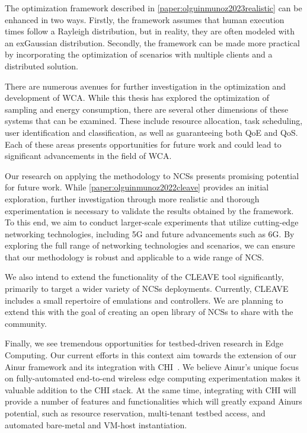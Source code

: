 The optimization framework described in \cref{paper:olguinmunoz2023realistic} can be enhanced in two ways.
Firstly, the framework assumes that human execution times follow a Rayleigh distribution, but in reality, they are often modeled with an \gls{exGaussian} distribution.
Secondly, the framework can be made more practical by incorporating the optimization of scenarios with multiple clients and a distributed solution.

There are numerous avenues for further investigation in the optimization and development of \gls{WCA}.
While this thesis has explored the optimization of sampling and energy consumption, there are several other dimensions of these systems that can be examined.
These include resource allocation, task scheduling, user identification and classification, as well as guaranteeing both \gls{QoE} and \gls{QoS}.
Each of these areas presents opportunities for future work and could lead to significant advancements in the field of \gls{WCA}.

\medskip
Our research on applying the methodology to \glspl{NCS} presents promising potential for future work.
While \cref{paper:olguinmunoz2022cleave} provides an initial exploration, further investigation through more realistic and thorough experimentation is necessary to validate the results obtained by the framework.
To this end, we aim to conduct larger-scale experiments that utilize cutting-edge networking technologies, including 5G and future advancements such as 6G.
By exploring the full range of networking technologies and scenarios, we can ensure that our methodology is robust and applicable to a wide range of \gls{NCS}.

We also intend to extend the functionality of the \gls{CLEAVE} tool significantly, primarily to target a wider variety of \glspl{NCS} deployments.
Currently, \gls{CLEAVE} includes a small repertoire of emulations and controllers.
We are planning to extend this with the goal of creating an open library of \glspl{NCS} to share with the community.

\medskip
Finally, we see tremendous opportunities for testbed-driven research in Edge Computing.
Our current efforts in this context aim towards the extension of our Ainur framework and its integration with \gls{CHI}~\cite{keahey2020lessons}.
We believe Ainur's unique focus on fully-automated end-to-end wireless edge computing experimentation makes it valuable addition to the \gls{CHI} stack.
At the same time, integrating with \gls{CHI} will provide a number of features and functionalities which will greatly expand Ainurs potential, such as resource reservation, multi-tenant testbed access, and automated bare-metal and \gls{VM}-host instantiation.

